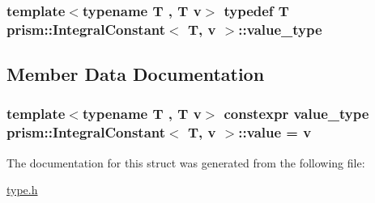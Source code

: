\subsubsection[{\texorpdfstring{value\+\_\+type}{value_type}}]{\setlength{\rightskip}{0pt plus 5cm}template$<$typename T , T v$>$ typedef T {\bf prism\+::\+Integral\+Constant}$<$ T, v $>$\+::{\bf value\+\_\+type}}\hypertarget{structprism_1_1_integral_constant_a95bc5b7fb717309af29af2c13f06ffe2}{}\label{structprism_1_1_integral_constant_a95bc5b7fb717309af29af2c13f06ffe2}


\subsection{Member Data Documentation}
\subsubsection[{\texorpdfstring{value}{value}}]{\setlength{\rightskip}{0pt plus 5cm}template$<$typename T , T v$>$ constexpr {\bf value\+\_\+type} {\bf prism\+::\+Integral\+Constant}$<$ T, v $>$\+::value = v\hspace{0.3cm}{\ttfamily [static]}}\hypertarget{structprism_1_1_integral_constant_ace2611e15a2d8b14e8f47beb9cbde3a2}{}\label{structprism_1_1_integral_constant_ace2611e15a2d8b14e8f47beb9cbde3a2}


The documentation for this struct was generated from the following file\+:\begin{DoxyCompactItemize}
\item 
\hyperlink{type_8h}{type.\+h}\end{DoxyCompactItemize}
